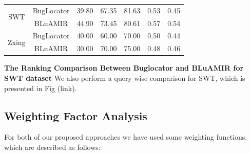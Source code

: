 \documentclass[conference]{IEEEtran}
\begin{document}
\begin{table}[htbp]
{\begin{tabular}{c|c|c|c|c|c|c}
			\multirow{2}{*}{SWT}                                                                               & BugLocator & 39.80 & 67.35 & 81.63 & 0.53 & 0.45 \\  \cline{2-7}  &BLuAMIR                                                                     & 44.90                                               & 73.45                                              & 80.61                                             &   0.57  &   0.54  \\ \hline
			\multirow{2}{*}{Zxing}                                                                               & BugLocator & 40.00 & 60.00 & 70.00 & 0.50 & 0.44 \\  \cline{2-7}   &BLuAMIR                                                                  & 30.00                                            & 70.00                                           & 75.00                                             &   0.48  &  0.46   \\ \hline
			
			
			
			\hline
	\end{tabular}}
	\centering
\end{table}

\textbf{The Ranking Comparison Between Buglocator and BLuAMIR for SWT dataset}
We also perform a query wise comparison for SWT, which is presented in Fig (link).

\subsection{Weighting Factor Analysis}
For both of our proposed approaches we have used some weighting functions, which are described as follows:
\end{document}
